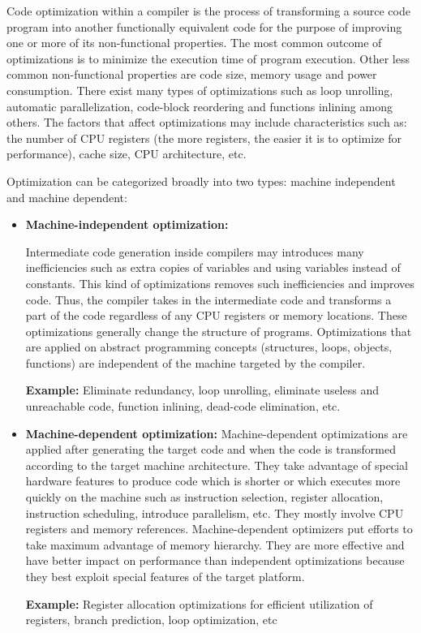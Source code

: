 Code optimization within a compiler is the process of transforming a source code program into another functionally equivalent code for the purpose of improving one or more of its non-functional properties. 
The most common outcome of optimizations is to minimize the execution time of program execution. Other less common non-functional properties are code size, memory usage and power consumption. 
There exist many types of optimizations such as loop unrolling, automatic parallelization, code-block reordering and functions inlining among others. The factors that affect optimizations may include characteristics such as: the number of CPU registers (the more registers, the easier it is to optimize for performance), cache size, CPU architecture, etc.

Optimization can be categorized broadly into two types: machine independent and machine dependent: 
\begin{itemize}
	
	\item \textbf{Machine-independent optimization:}
	
	Intermediate code generation  inside compilers may introduces many inefficiencies such as extra copies of variables and using variables instead of
	constants.
	This kind of optimizations removes such inefficiencies and improves code. Thus, the compiler takes in the intermediate code and transforms a part of the code regardless of any CPU registers or memory locations. These optimizations generally change the structure of programs.
	Optimizations that are applied on abstract programming concepts (structures, loops, objects, functions) are independent of the machine targeted by the compiler.
	
	\textbf{Example:} Eliminate redundancy, loop unrolling, eliminate useless and unreachable code, function inlining, dead-code elimination, etc.
	
	\item \textbf{Machine-dependent optimization:} 
	Machine-dependent optimizations are applied after generating the target code and when the code is transformed according to the target machine architecture. They take advantage of special hardware features to produce code which is shorter or which executes more quickly on the machine such as instruction selection, register allocation, instruction scheduling, introduce parallelism, etc.
	They mostly involve CPU registers and memory references. Machine-dependent optimizers put efforts to take maximum advantage of memory hierarchy. They are more effective and have better impact on performance than independent optimizations because they best exploit special features of the target platform.
	
	\textbf{Example:} Register allocation optimizations for efficient utilization of registers, branch prediction, loop optimization, etc
 
 
\end{itemize}
 

